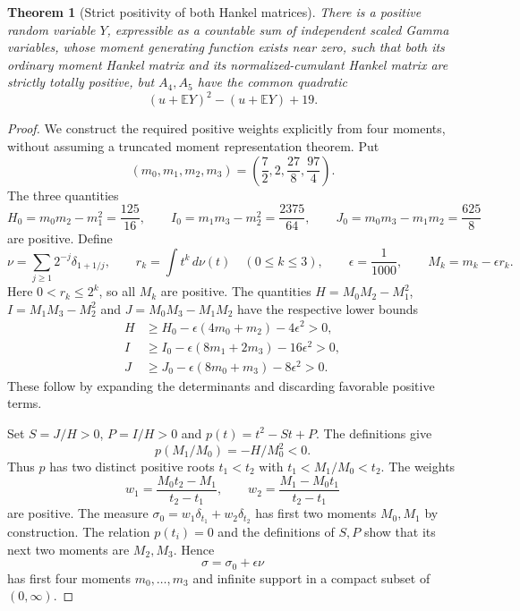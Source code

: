 \documentclass[11pt]{article}
\newtheorem{theorem}{Theorem}
\newcommand{\E}{\mathbb E}
\begin{document}
\begin{theorem}[Strict positivity of both Hankel matrices]
\label{thm:strict-obstruction}
There is a positive random variable $Y$, expressible as a countable
sum of independent scaled Gamma variables, whose moment generating
function exists near zero, such that both its ordinary moment Hankel
matrix and its normalized-cumulant Hankel matrix are strictly totally
positive, but $A_4,A_5$ have the common quadratic
\[
 (u+\E Y)^2-(u+\E Y)+19.
\]
\end{theorem}
\begin{proof}
We construct the required positive weights explicitly from four
moments, without assuming a truncated moment representation theorem.
Put
\[
 (m_0,m_1,m_2,m_3)
   =\left(\frac72,2,
                      \frac{27}{8},\frac{97}{4}\right).
\]
The three quantities
\[
 H_0=m_0m_2-m_1^2=\frac{125}{16},\qquad
 I_0=m_1m_3-m_2^2=\frac{2375}{64},\qquad
 J_0=m_0m_3-m_1m_2=\frac{625}{8}
\]
are positive. Define
\[
 \nu=\sum_{j\ge1}2^{-j}\delta_{1+1/j},\qquad
 r_k=\int t^k\,d\nu(t)\quad(0\le k\le3),\qquad
 \epsilon=\frac1{1000},\qquad M_k=m_k-\epsilon r_k.
\]
Here $0<r_k\le2^k$, so all $M_k$ are positive.
The quantities $H=M_0M_2-M_1^2$, $I=M_1M_3-M_2^2$ and
$J=M_0M_3-M_1M_2$ have the respective lower bounds
\[
 \begin{split}
 H&\ge H_0-\epsilon(4m_0+m_2)-4\epsilon^2>0,\\
 I&\ge I_0-\epsilon(8m_1+2m_3)-16\epsilon^2>0,\\
 J&\ge J_0-\epsilon(8m_0+m_3)-8\epsilon^2>0.
 \end{split}
\]
These follow by expanding the determinants and discarding favorable
positive terms.

Set $S=J/H>0$, $P=I/H>0$ and $p(t)=t^2-St+P$.
The definitions give
\[
 p(M_1/M_0)=-H/M_0^2<0.
\]
Thus $p$ has two distinct positive roots $t_1<t_2$ with
$t_1<M_1/M_0<t_2$. The weights
\[
 w_1=\frac{M_0t_2-M_1}{t_2-t_1},\qquad
 w_2=\frac{M_1-M_0t_1}{t_2-t_1}
\]
are positive. The measure
$\sigma_0=w_1\delta_{t_1}+w_2\delta_{t_2}$ has first two
moments $M_0,M_1$ by construction. The relation $p(t_i)=0$
and the definitions of $S,P$ show that its next two moments are
$M_2,M_3$. Hence
\[
 \sigma=\sigma_0+\epsilon\nu
\]
has first four moments $m_0,\ldots,m_3$ and infinite support in a
compact subset of $(0,\infty)$.


\end{proof}
\end{document}
